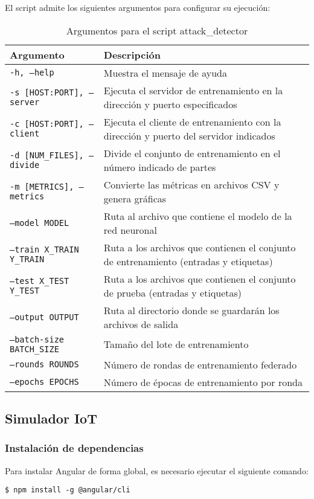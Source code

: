 El script admite los siguientes argumentos para configurar su ejecución:
\begin{table}[h]
	\centering
	\begin{tabularx}{\linewidth}{ p{} X }
		\toprule
		\textbf{Argumento} & \textbf{Descripción} \\
		\toprule
        \texttt{-h, --help} & Muestra el mensaje de ayuda \\
        \texttt{-s [HOST:PORT], --server} & Ejecuta el servidor de entrenamiento en la dirección y puerto especificados \\
        \texttt{-c [HOST:PORT], --client} & Ejecuta el cliente de entrenamiento con la dirección y puerto del servidor indicados \\
        \texttt{-d [NUM\_FILES], --divide} & Divide el conjunto de entrenamiento en el número indicado de partes \\
        \texttt{-m [METRICS], --metrics} & Convierte las métricas en archivos CSV y genera gráficas \\
        \texttt{--model MODEL} & Ruta al archivo que contiene el modelo de la red neuronal \\
        \texttt{--train X\_TRAIN Y\_TRAIN} & Ruta a los archivos que contienen el conjunto de entrenamiento (entradas y etiquetas) \\
        \texttt{--test X\_TEST Y\_TEST} & Ruta a los archivos que contienen el conjunto de prueba (entradas y etiquetas) \\
        \texttt{--output OUTPUT} & Ruta al directorio donde se guardarán los archivos de salida \\
        \texttt{--batch-size BATCH\_SIZE} & Tamaño del lote de entrenamiento \\
        \texttt{--rounds ROUNDS} & Número de rondas de entrenamiento federado \\
        \texttt{--epochs EPOCHS} & Número de épocas de entrenamiento por ronda \\
		\bottomrule
	\end{tabularx}
	\caption{Argumentos para el script attack\_detector}
\end{table}

\newpage
\subsection{Simulador IoT}
\label{subsec:ConfiguracionSimuladorIoT}
\subsubsection{Instalación de dependencias}
\label{subsubsec:InstalacionDependencias}
Para instalar Angular de forma global, es necesario ejecutar el siguiente comando:
\begin{verbatim}
$ npm install -g @angular/cli
\end{verbatim}

